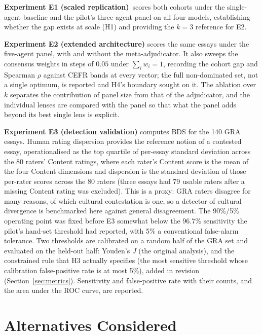 \textbf{Experiment E1 (scaled replication)}\ scores both cohorts under
the single-agent baseline and the pilot's three-agent panel on all
four models, establishing whether the gap exists at scale (H1) and
providing the $k{=}3$ reference for E2.

\textbf{Experiment E2 (extended architecture)} scores the same essays
under the five-agent panel, with and without the meta-adjudicator.
It also sweeps the consensus weights in steps of $0.05$ under
$\sum_i w_i = 1$, recording the cohort gap and Spearman $\rho$
against CEFR bands at every vector; the full non-dominated set,
not a single optimum, is reported and H4's boundary sought on it. The
ablation over $k$ separates the contribution of panel size from that
of the adjudicator, and the individual lenses are compared with the
panel so that what the panel adds beyond its best single lens is
explicit.

\textbf{Experiment E3 (detection validation)} computes BDS for the
140 GRA essays. Human rating dispersion provides the reference notion
of a contested essay, operationalised as the top quartile of
per-essay standard deviation across the 80 raters' Content ratings,
where each rater's Content score is the mean of the four Content
dimensions and dispersion is the standard deviation of those
per-rater scores across the 80 raters (three essays had 79 usable
raters after a missing Content rating was excluded). This is a
proxy: GRA raters disagree for many reasons, of which cultural
contestation is one, so a detector of cultural divergence is
benchmarked here against general disagreement. The 90\%/5\%
operating point was fixed before E3 somewhat below the 96.7\%
sensitivity the pilot's hand-set threshold had reported, with 5\% a
conventional false-alarm tolerance. Two thresholds are calibrated
on a random half of the GRA set and evaluated on the held-out half:
Youden's $J$ (the original analysis), and the constrained rule that
H3 actually specifies (the most sensitive threshold whose
calibration false-positive rate is at most 5\%), added in revision
(Section~\ref{sec:metrics}). Sensitivity and false-positive rate
with their counts, and the area under the ROC curve, are reported.

\section{Alternatives Considered}
\label{sec:alternatives}

